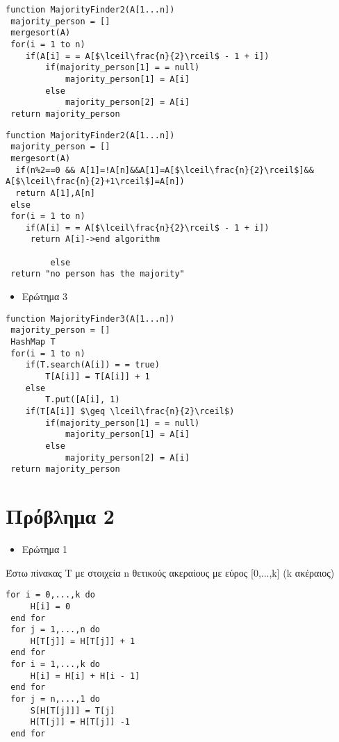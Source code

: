 \documentclass[a4paper]{article}
\begin{document}
\pagebreak

\begin{lstlisting}[mathescape]
function MajorityFinder2(A[1...n])
 majority_person = []
 mergesort(A)
 for(i = 1 to n)
 	if(A[i] = = A[$\lceil\frac{n}{2}\rceil$ - 1 + i])
 		if(majority_person[1] = = null)
 			majority_person[1] = A[i]
 		else
 			majority_person[2] = A[i]
 return majority_person
\end{lstlisting}


\begin{lstlisting}[mathescape]
function MajorityFinder2(A[1...n])
 majority_person = []
 mergesort(A)
  if(n%2==0 && A[1]=!A[n]&&A[1]=A[$\lceil\frac{n}{2}\rceil$]&& A[$\lceil\frac{n}{2}+1\rceil$]=A[n])
  return A[1],A[n]   
 else     
 for(i = 1 to n)
 	if(A[i] = = A[$\lceil\frac{n}{2}\rceil$ - 1 + i])
     return A[i]->end algorithm
 	
         else 
 return "no person has the majority"
\end{lstlisting}

\begin{itemize}
\item Ερώτημα 3
\end{itemize}

\begin{lstlisting}[mathescape]
function MajorityFinder3(A[1...n])
 majority_person = []
 HashMap T
 for(i = 1 to n)
 	if(T.search(A[i]) = = true)
 		T[A[i]] = T[A[i]] + 1
 	else 
 		T.put([A[i], 1)
 	if(T[A[i]] $\geq \lceil\frac{n}{2}\rceil$)
 		if(majority_person[1] = = null)
 			majority_person[1] = A[i]
 		else
 			majority_person[2] = A[i]
 return majority_person
\end{lstlisting}

\section*{Πρόβλημα 2}

\begin{itemize}
\item Ερώτημα 1
\end{itemize}

\lstset{frame=none}
\begin{tcolorbox}[colback=blue!20!white,colframe=purple!60!white,title=\textbf{Algorithm 1}]
Έστω πίνακας T με στοιχεία n θετικούς ακεραίους με εύρος [0,...,k] (k ακέραιος)
\begin{lstlisting}[mathescape]
 for i = 0,...,k do
	 H[i] = 0
 end for
 for j = 1,...,n do
	 H[T[j]] = H[T[j]] + 1
 end for
 for i = 1,...,k do
	 H[i] = H[i] + H[i - 1]
 end for
 for j = n,...,1 do
	 S[H[T[j]]] = T[j]
	 H[T[j]] = H[T[j]] -1
 end for
\end{lstlisting}
\end{tcolorbox}
\end{document}

